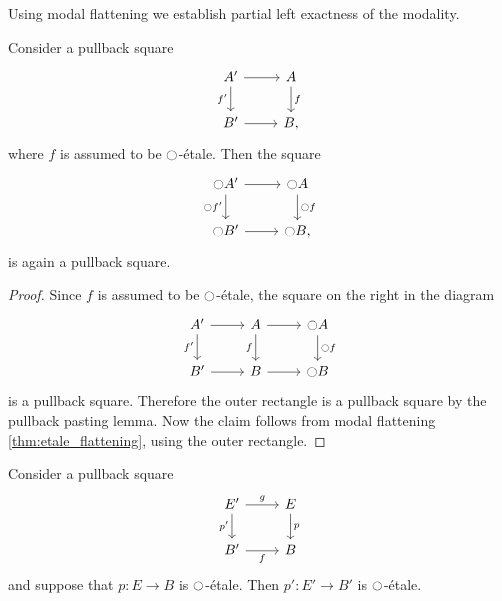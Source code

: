 \documentclass[9pt,twosided]{amsart}
\begin{document}
Using modal flattening we establish partial left exactness of the modality.

\begin{cor}\label{cor:etale_lex}
Consider a pullback square
\begin{equation*}
\begin{tikzcd}
A' \arrow[d,swap,"{f'}"] \arrow[r] & A \arrow[d,"f"] \\
B' \arrow[r] & B,
\end{tikzcd}
\end{equation*}
where $f$ is assumed to be ${\ocircle}$-\'etale. Then the square
\begin{equation*}
\begin{tikzcd}
\modal A' \arrow[d,swap,"{\modal f'}"] \arrow[r] & \modal A \arrow[d,"\modal f"] \\
\modal B' \arrow[r] & \modal B,
\end{tikzcd}
\end{equation*}
is again a pullback square.
\end{cor}

\begin{proof}
Since $f$ is assumed to be ${\ocircle}$-\'etale, the square on the right in the diagram
\begin{equation*}
\begin{tikzcd}
A' \arrow[r] \arrow[d,swap,"{f'}"] & A \arrow[r] \arrow[d,swap,"f"] & \modal A \arrow[d,"\modal f"] \\
B' \arrow[r] & B \arrow[r] & \modal B
\end{tikzcd}
\end{equation*}
is a pullback square. Therefore the outer rectangle is a pullback square by the pullback pasting lemma. Now the claim follows from modal flattening \cref{thm:etale_flattening}, using the outer rectangle.
\end{proof}

\begin{cor}\label{cor:etale_pb}
Consider a pullback square
\begin{equation*}
\begin{tikzcd}
E' \arrow[d,swap,"{p'}"] \arrow[r,"g"] & E \arrow[d,"p"] \\
B' \arrow[r,swap,"f"] & B
\end{tikzcd}
\end{equation*} 
and suppose that $p:E\to B$ is ${\ocircle}$-\'etale. Then $p':E'\to B'$ is ${\ocircle}$-\'etale.
\end{cor}
\end{document}
